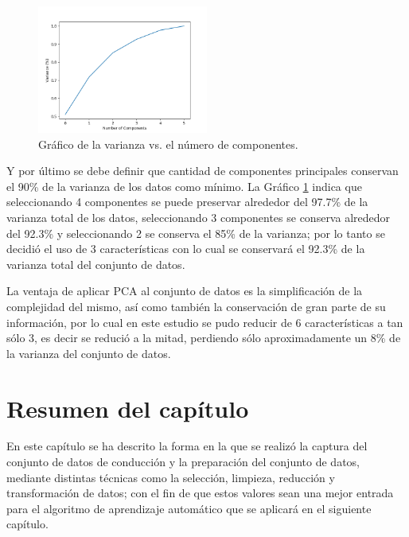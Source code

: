 \begin{figure}[h!]
  \begin{center}	\includegraphics[width=0.5\textwidth,frame]{imagenes/Cap3/pca}
  \caption{Gr\'{a}fico de la varianza vs. el n\'{u}mero de componentes.}
  \label{fig:varianza-pca}
  \end{center}
\end{figure}

\vspace{5mm} %

Y por \'{u}ltimo se debe definir que cantidad de componentes principales conservan el 90\% de la varianza de los datos como m\'{i}nimo. La Gr\'{a}fico \ref{fig:varianza-pca} indica que seleccionando 4 componentes se puede preservar alrededor del 97.7\% de la varianza total de los datos, seleccionando 3 componentes se conserva alrededor del 92.3\% y seleccionando 2 se conserva el 85\% de la varianza; por lo tanto se decidi\'{o} el uso de 3 caracter\'{i}sticas con lo cual se conservar\'{a} el 92.3\% de la varianza total del conjunto de datos.

\vspace{5mm} %

La ventaja de aplicar PCA al conjunto de datos es la simplificaci\'{o}n de la complejidad del mismo, as\'{i} como tambi\'{e}n la conservaci\'{o}n de gran parte de su informaci\'{o}n, por lo cual en este estudio se pudo reducir de 6 caracter\'{i}sticas a tan s\'{o}lo 3, es decir se reduci\'{o} a la mitad, perdiendo s\'{o}lo aproximadamente un 8\% de la varianza del conjunto de datos.

\section{Resumen del cap\'{i}tulo}

En este cap\'{i}tulo se ha descrito la forma en la que se realiz\'{o} la captura del conjunto de datos de conducci\'{o}n y la preparaci\'{o}n del conjunto de datos, mediante distintas t\'{e}cnicas como la selecci\'{o}n, limpieza, reducci\'{o}n y transformaci\'{o}n de datos; con el fin de que estos valores sean una mejor entrada para el algoritmo de aprendizaje autom\'{a}tico que se aplicar\'{a} en el siguiente cap\'{i}tulo.